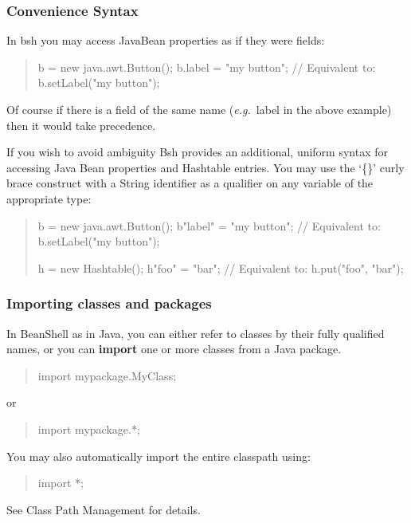 \documentclass[twoside,11pt,nolof]{starlink}
\providecommand{\eg}{\textit{e.g.}}
\begin{document}
\subsubsection{Convenience Syntax}
In bsh you may access JavaBean properties as if they were fields:
\begin{quote}
\begin{terminalv}
    b = new java.awt.Button();
    b.label = "my button";  // Equivalent to: b.setLabel("my button");
\end{terminalv}
\end{quote}

Of course if there is a field of the same name (\eg\ label in the above
example) then it would take precedence.

If you wish to avoid ambiguity Bsh provides an additional, uniform
syntax for accessing Java Bean properties and Hashtable entries.  You
may use the `\{\}' curly brace construct with a String identifier as a
qualifier on any variable of the appropriate type:
\begin{quote}
\begin{terminalv}
    b = new java.awt.Button();
    b{"label"} = "my button";  // Equivalent to: b.setLabel("my button");

    h = new Hashtable();
    h{"foo"} = "bar";          // Equivalent to: h.put("foo", "bar");
\end{terminalv}
\end{quote}

\subsubsection{Importing classes and packages}

In BeanShell as in Java, you can either refer to classes by their fully
qualified names, or you can \textbf{import} one or more classes
from a Java package.
\begin{quote}
\begin{terminalv}
    import mypackage.MyClass;
\end{terminalv}
\end{quote}
or
\begin{quote}
\begin{terminalv}
    import mypackage.*;
\end{terminalv}
\end{quote}
You may also automatically import the entire classpath using:
\begin{quote}
\begin{terminalv}
    import *;
\end{terminalv}
\end{quote}
See Class Path Management for details.
\end{document}
